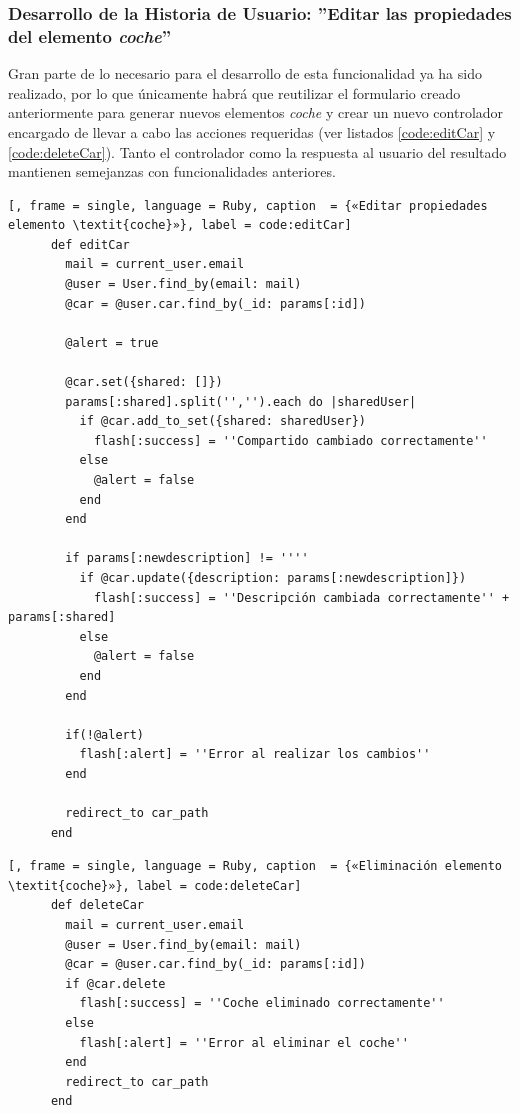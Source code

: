 	\subsubsection{Desarrollo de la Historia de Usuario: ''Editar las propiedades del elemento \textit{coche}'' }
		Gran parte de lo necesario para el desarrollo de esta funcionalidad ya ha sido realizado, por lo que únicamente habrá que reutilizar el formulario creado anteriormente para generar nuevos elementos \textit{coche} y crear un nuevo controlador encargado de llevar a cabo las acciones requeridas (ver listados \ref{code:editCar} y \ref{code:deleteCar}). Tanto el controlador como la respuesta al usuario del resultado mantienen semejanzas con funcionalidades anteriores. 
		
	\begin{lstlisting}[, frame = single, language = Ruby, caption  = {«Editar propiedades elemento \textit{coche}»}, label = code:editCar]
	  def editCar
	    mail = current_user.email
	    @user = User.find_by(email: mail)
	    @car = @user.car.find_by(_id: params[:id])
	
	    @alert = true
	
	    @car.set({shared: []})
	    params[:shared].split('','').each do |sharedUser|
	      if @car.add_to_set({shared: sharedUser})
	        flash[:success] = ''Compartido cambiado correctamente''
	      else
	        @alert = false
	      end
	    end
	
	    if params[:newdescription] != ''''
	      if @car.update({description: params[:newdescription]})
	        flash[:success] = ''Descripción cambiada correctamente'' + params[:shared]
	      else
	        @alert = false
	      end
	    end
	    
	    if(!@alert)
	      flash[:alert] = ''Error al realizar los cambios''
	    end
	
	    redirect_to car_path
	  end
	\end{lstlisting}

	\begin{lstlisting}[, frame = single, language = Ruby, caption  = {«Eliminación elemento \textit{coche}»}, label = code:deleteCar]
	  def deleteCar
	    mail = current_user.email
	    @user = User.find_by(email: mail)
	    @car = @user.car.find_by(_id: params[:id])
	    if @car.delete
	      flash[:success] = ''Coche eliminado correctamente''
	    else
	      flash[:alert] = ''Error al eliminar el coche''
	    end
	    redirect_to car_path
	  end
	\end{lstlisting}
		
